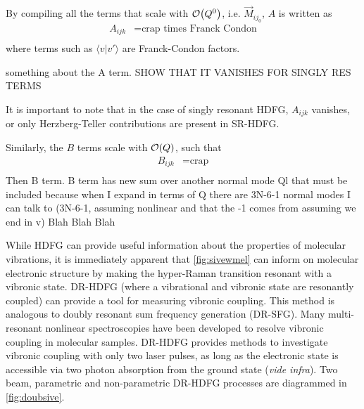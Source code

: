 \documentclass[aip, jcp, reprint, onecolumn]{revtex4-2}
\begin{document}
By compiling all the terms that scale with $\order{Q^0}$, i.e. $\vec{M}_{ij_0}$, $A$ is written as
\begin{equation}
	\begin{split}
		A_{ijk} &= \text{crap times Franck Condon}\\
	\end{split}
\end{equation}
where terms such as $\langle v | v' \rangle$ are Franck-Condon factors.

something about the A term. SHOW THAT IT VANISHES FOR SINGLY RES TERMS

It is important to note that in the case of singly resonant HDFG, $A_{ijk}$ vanishes, or only Herzberg-Teller contributions are present in SR-HDFG. \cite{Neddersen1989}

Similarly, the $B$ terms scale with $\order{Q}$, such that
\begin{equation}
	\begin{split}
		B_{ijk} &= \text{crap}\\
	\end{split}
\end{equation}
Then B term. 
B term has new sum over another normal mode Ql that must be included because when I expand in terms of Q there are 3N-6-1 normal modes I can talk to (3N-6-1, assuming nonlinear and that the -1 comes from assuming we end in v)
Blah Blah Blah

While HDFG can provide useful information about the properties of molecular vibrations, it is immediately apparent that \autoref{fig:sivewmel} can inform on molecular electronic structure by making the hyper-Raman transition resonant with a vibronic state.
DR-HDFG (where a vibrational and vibronic state are resonantly coupled) can provide a tool for measuring vibronic coupling.
This method is analogous to doubly resonant sum frequency generation (DR-SFG). \cite{Shen94}
Many multi-resonant nonlinear spectroscopies have been developed to resolve vibronic coupling in molecular samples. \cite{Carlson1990, Gaynor2017, RN276}
DR-HDFG provides methods to investigate vibronic coupling with only two laser pulses, as long as the electronic state is accessible via two photon absorption from the ground state (\textit{vide infra}).
Two beam, parametric and non-parametric DR-HDFG processes are diagrammed in \autoref{fig:doubsive}.
\end{document}
